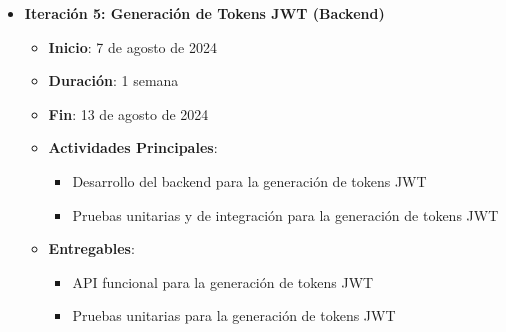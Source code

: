 \begin{itemize}
\begin{itemize}
              \item \textbf{Iteración 5: Generación de Tokens JWT (Backend)}
                    \begin{itemize}
                        \item \textbf{Inicio}: 7 de agosto de 2024
                        \item \textbf{Duración}: 1 semana
                        \item \textbf{Fin}: 13 de agosto de 2024
                        \item \textbf{Actividades Principales}:
                              \begin{itemize}
                                  \item Desarrollo del backend para la generación de tokens JWT
                                  \item Pruebas unitarias y de integración para la generación de tokens JWT
                              \end{itemize}
                        \item \textbf{Entregables}:
                              \begin{itemize}
                                  \item API funcional para la generación de tokens JWT
                                  \item Pruebas unitarias para la generación de tokens JWT
                              \end{itemize}
                    \end{itemize}


\end{itemize}
\end{itemize}

